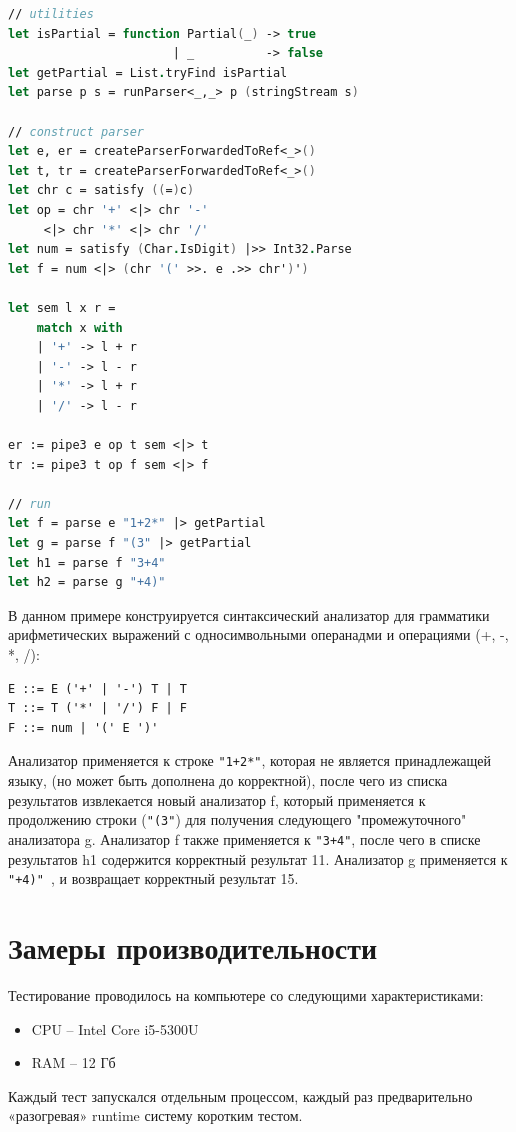 \documentclass[14pt]{matmex-diploma}
\begin{document}
\begin{lstlisting}[language=FSharp]
// utilities
let isPartial = function Partial(_) -> true 
                       | _          -> false
let getPartial = List.tryFind isPartial
let parse p s = runParser<_,_> p (stringStream s)

// construct parser
let e, er = createParserForwardedToRef<_>()
let t, tr = createParserForwardedToRef<_>()
let chr c = satisfy ((=)c) 
let op = chr '+' <|> chr '-' 
     <|> chr '*' <|> chr '/'
let num = satisfy (Char.IsDigit) |>> Int32.Parse
let f = num <|> (chr '(' >>. e .>> chr')')

let sem l x r = 
    match x with 
    | '+' -> l + r 
    | '-' -> l - r
    | '*' -> l + r 
    | '/' -> l - r
    
er := pipe3 e op t sem <|> t
tr := pipe3 t op f sem <|> f

// run
let f = parse e "1+2*" |> getPartial 
let g = parse f "(3" |> getPartial
let h1 = parse f "3+4"
let h2 = parse g "+4)"
\end{lstlisting}

В данном примере конструируется синтаксический анализатор для грамматики арифметических выражений 
с односимвольными операнадми и операциями (+, -, *, /):
\begin{lstlisting}
E ::= E ('+' | '-') T | T
T ::= T ('*' | '/') F | F
F ::= num | '(' E ')' 
\end{lstlisting}
Анализатор применяется к строке {\tt "1+2*"}, которая не является принадлежащей языку, 
  (но может быть дополнена до корректной), после чего из списка результатов 
  извлекается новый анализатор f, который применяется к продолжению строки 
  ({\tt "(3"}) для получения следующего "промежуточного" анализатора g. Анализатор f также
  применяется к {\tt "3+4"}, после чего в списке результатов h1 содержится корректный
  результат 11. Анализатор g применяется к {\tt "+4)" }, и возвращает корректный результат 15.






\section{Замеры производительности}

Тестирование проводилось на компьютере со следующими характеристиками:
\begin{itemize}
    \item CPU – Intel Core i5-5300U
    \item RAM – 12 Гб
\end{itemize}
Каждый тест запускался отдельным процессом, каждый раз предварительно «разогревая» runtime 
систему коротким тестом.\\
\end{document}
